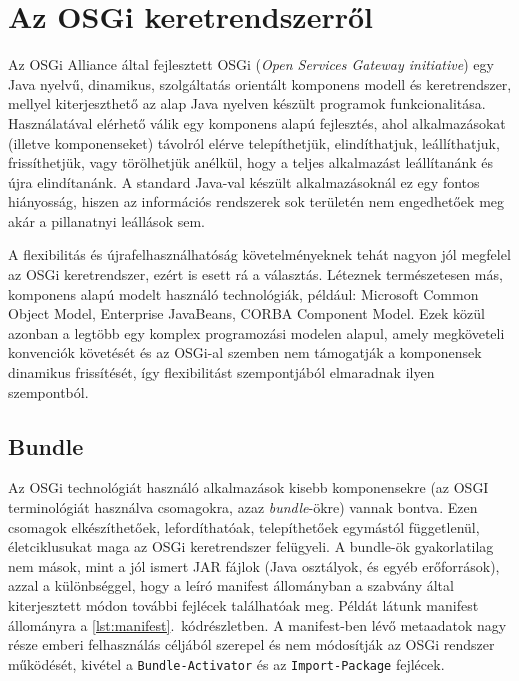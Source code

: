 \chapter{Az OSGi keretrendszerről}
\label{cha:osgi}

Az OSGi Alliance \cite{osgi} által fejlesztett OSGi (\textit{Open Services Gateway initiative}) egy Java nyelvű, dinamikus, szolgáltatás orientált komponens modell és keretrendszer, mellyel kiterjeszthető az alap Java nyelven készült programok funkcionalitása. Használatával elérhető válik egy komponens alapú fejlesztés, ahol alkalmazásokat (illetve komponenseket) távolról elérve telepíthetjük, elindíthatjuk, leállíthatjuk, frissíthetjük, vagy törölhetjük anélkül, hogy a teljes alkalmazást leállítanánk és újra elindítanánk. A standard Java-val készült alkalmazásoknál ez egy fontos hiányosság, hiszen az információs rendszerek sok területén nem engedhetőek meg akár a pillanatnyi leállások sem.

A flexibilitás és újrafelhasználhatóság követelményeknek tehát nagyon jól megfelel az OSGi keretrendszer, ezért is esett rá a választás. Léteznek természetesen más, komponens alapú modelt használó technológiák, például: Microsoft Common Object Model, Enterprise JavaBeans, CORBA Component Model. Ezek közül azonban a legtöbb egy komplex programozási modelen alapul, amely megköveteli konvenciók követését és az OSGi-al szemben nem támogatják a komponensek dinamikus frissítését, így flexibilitást szempontjából elmaradnak ilyen szempontból.

\section{Bundle}
\label{sec:bundle}

Az OSGi technológiát \cite{osgiintro}\cite{hall_challenges_2004}\cite{towardosgi} használó alkalmazások kisebb komponensekre (az OSGI terminológiát használva csomagokra, azaz \textit{bundle}-ökre) vannak bontva. Ezen csomagok elkészíthetőek, lefordíthatóak, telepíthetőek egymástól függetlenül, életciklusukat maga az OSGi keretrendszer felügyeli. A bundle-ök gyakorlatilag nem mások, mint a jól ismert JAR fájlok (Java osztályok, és egyéb erőforrások), azzal a különbséggel, hogy a leíró manifest állományban a szabvány által kiterjesztett módon további fejlécek találhatóak meg. Példát látunk manifest állományra a \ref{lst:manifest}.~kódrészletben. A manifest-ben lévő metaadatok nagy része emberi felhasználás céljából szerepel és nem módosítják az OSGi rendszer működését, kivétel a \texttt{Bundle-Activator} és az \texttt{Import-Package} fejlécek.

